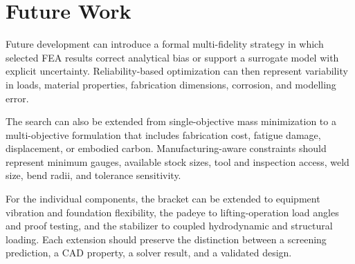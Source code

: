 \section{Future Work}
\label{sec:future-research}

Future development can introduce a formal multi-fidelity strategy in which
selected FEA results correct analytical bias or support a surrogate model with
explicit uncertainty. Reliability-based optimization can then represent
variability in loads, material properties, fabrication dimensions, corrosion,
and modelling error.

The search can also be extended from single-objective mass minimization to a
multi-objective formulation that includes fabrication cost, fatigue damage,
displacement, or embodied carbon. Manufacturing-aware constraints should
represent minimum gauges, available stock sizes, tool and inspection access,
weld size, bend radii, and tolerance sensitivity.

For the individual components, the bracket can be extended to equipment
vibration and foundation flexibility, the padeye to lifting-operation load
angles and proof testing, and the stabilizer to coupled hydrodynamic and
structural loading. Each extension should preserve the distinction between a
screening prediction, a CAD property, a solver result, and a validated design.

